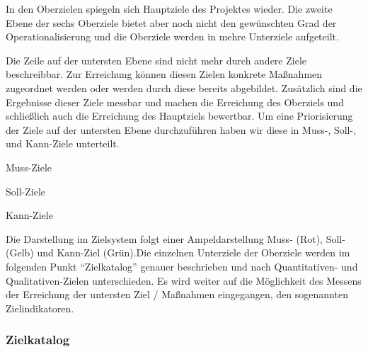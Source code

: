 In den Oberzielen spiegeln sich Hauptziele des Projektes wieder. Die zweite
Ebene der sechs Oberziele bietet aber noch nicht den gewünschten Grad der
Operationalisierung und die Oberziele werden in mehre Unterziele aufgeteilt.

Die Zeile auf der untersten Ebene sind nicht mehr durch andere Ziele
beschreibbar. Zur Erreichung können diesen Zielen konkrete Maßnahmen zugeordnet
werden oder werden durch diese bereits abgebildet. Zusätzlich sind die
Ergebnisse dieser Ziele messbar und machen die Erreichung des Oberziels und
schließlich auch die Erreichung des Hauptziels bewertbar.
Um eine Priorisierung der Ziele auf der untersten Ebene durchzuführen haben wir
diese in Muss-, Soll-, und Kann-Ziele unterteilt.

Muss-Ziele

Soll-Ziele

Kann-Ziele

Die Darstellung im Zielsystem folgt einer Ampeldarstellung Muss- (Rot), Soll-
(Gelb) und Kann-Ziel (Grün).Die einzelnen Unterziele der Oberziele werden im
folgenden Punkt "`Zielkatalog"' genauer beschrieben und nach Quantitativen- und
Qualitativen-Zielen unterschieden. Es wird weiter auf die Möglichkeit des
Messens der Erreichung der untersten Ziel / Maßnahmen eingegangen, den
sogenannten Zielindikatoren.

\subsubsection{Zielkatalog}
\label{sec:Zielkatalog}
